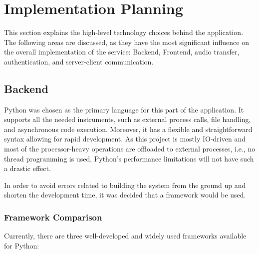 \chapter{Implementation Planning}\label{ch:planning}

This section explains the high-level technology choices behind the application.
The following areas are discussed, as they have the most significant influence on the overall implementation of the service:
Backend, Frontend, audio transfer, authentication, and server-client communication.


\section{Backend}
Python\cite{python} was chosen as the primary language for this part of the application.
It supports all the needed instruments, such as external process calls,
file handling, and asynchronous code execution. Moreover, it has a flexible and straightforward
syntax allowing for rapid development.
As this project is mostly IO-driven and most of the processor-heavy operations are offloaded to external processes,
i.e., no thread programming is used, Python's performance limitations\cite{gil} will not have such a drastic effect.

In order to avoid errors related to building the system from the ground up
and shorten the development time, it was decided that a framework would be used.

\subsection{Framework Comparison}
Currently, there are three well-developed and widely used frameworks available for Python:

